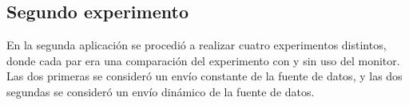 %
%
%
%
%
%
%

\subsection{Segundo experimento}
En la segunda aplicación se procedió a realizar cuatro experimentos distintos, donde cada par era una comparación del experimento con y sin uso del monitor. Las dos primeras se consideró un envío constante de la fuente de datos, y las dos segundas se consideró un envío dinámico de la fuente de datos.

